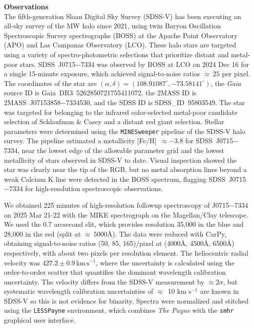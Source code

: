 \documentclass{natureprintstyle}
\newcommand{\code}[1]{\texttt{#1}\xspace}
\newcommand{\unit}[1]{\ensuremath{\mathrm{\,#1}}\xspace}
\newcommand{\kms}{\unit{km\,s^{-1}}}
\newcommand{\umpstarsdss}{SDSS~J0715$-$7334\xspace}
\newcommand{\umpstar}{J0715$-$7334\xspace}
\newcommand{\umpstartmass}{2MASS~J07153858$-$7334530\xspace}
\newcommand{\umpstargaia}{Gaia~DR3~5262850721755411072\xspace}
\newcommand{\umpstarsdssid}{SDSS\_ID~95803549\xspace}
\begin{document}
\noindent
{\bf Observations}
\\
\noindent
The fifth-generation Sloan Digital Sky Survey (SDSS-V\cite{Kollmeier2025}) has been executing an all-sky survey of the MW halo since 2021, using twin Baryon Oscillation Spectroscopic Survey spectrographs (BOSS\cite{Smee2013}) at the Apache Point Observatory (APO) and Las Campanas Observatory (LCO). 
These halo stars are targeted using a variety of spectro-photometric selections that prioritize distant and metal-poor stars\cite{Chandra2025}. 
\umpstarsdss{} was observed by BOSS at LCO on 2024 Dec 16 for a single 15-minute exposure, which achieved signal-to-noise ratios ${\approx}~25$ per pixel.
The coordinates of the star are $(\alpha,\delta) = (108.91087^\circ, -73.58141^\circ)$, the \textit{Gaia} source ID is \umpstargaia, the 2MASS ID is \umpstartmass, and the SDSS ID is \umpstarsdssid.
The star was targeted for belonging to the infrared color-selected metal-poor candidate selection of Schlaufman \& Casey\cite{Schlaufman2014} and a distant red giant selection\cite{Conroy2018, Conroy2021, Chandra2023b, Chandra2025}. 
Stellar parameters were determined using the \code{MINESweeper} pipeline of the SDSS-V halo survey\cite{Cargile2020, Chandra2025}. 
The pipeline estimated a metallicity [Fe/H]~$\approx -3.8$ for \umpstarsdss{}, near the lowest edge of the allowable parameter grid and the lowest metallicity of stars observed in SDSS-V to date. 
Visual inspection showed the star was clearly near the tip of the RGB, but no metal absorption lines beyond a weak Calcium K line were detected in the BOSS spectrum, flagging \umpstarsdss{} for high-resolution spectroscopic observations. 

We obtained 225 minutes of high-resolution followup spectroscopy of \umpstar on 2025 Mar 21-22 with the MIKE spectrograph\cite{Bernstein2003} on the Magellan/Clay telescope.
We used the 0.7 arcsecond slit, which provides resolution 35,000 in the blue and 28,000 in the red (split at ${\approx}~5000${\AA}).
The data were reduced with CarPy\cite{Kelson2003}, obtaining signal-to-noise ratios (50, 85, 165)/pixel at (4000{\AA}, 4500{\AA}, 6500{\AA}) respectively, with about two pixels per resolution element.
The heliocentric radial velocity was $427.2 \pm 0.9 \kms$, where the uncertainty is calculated using the order-to-order scatter that quantifies the dominant wavelength calibration uncertainty\cite{Ji2020}.
The velocity differs from the SDSS-V measurement by ${\approx}2\sigma$, but systematic wavelength calibration uncertainties of ${\approx}$~10 km s$^{-1}$ are known in SDSS-V\cite{Chandra2025} so this is not evidence for binarity.
Spectra were normalized and stitched using the \code{LESSPayne} environment\cite{Ji2025ascl},
which combines \textit{The Payne}\cite{Ting2019} with the \code{smhr} graphical user interface\cite{Casey2014}.
\end{document}
